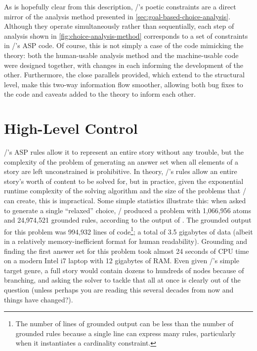 As is hopefully clear from this description, \dunyazad/'s poetic constraints are a direct mirror of the analysis method presented in \cref{sec:goal-based-choice-analysis}.
%
Although they operate simultaneously rather than sequentially, each step of analysis shown in \cref{fig:choice-analysis-method} corresponds to a set of constraints in \dunyazad/'s ASP code.
%
Of course, this is not simply a case of the code mimicking the theory: both the human-usable analysis method and the machine-usable code were designed together, with changes in each informing the development of the other.
%
Furthermore, the close parallels provided, which extend to the structural level, make this two-way information flow smoother, allowing both bug fixes to the code and caveats added to the theory to inform each other.



\section{High-Level Control}
\label{sec:dunyazad-control}%

\dunyazad/'s ASP rules allow it to represent an entire story without any trouble, but the complexity of the problem of generating an answer set when all elements of a story are left unconstrained is prohibitive.
%
In theory, \dunyazad/'s rules allow an entire story's worth of content to be solved for, but in practice, given the exponential runtime complexity of the solving algorithm and the size of the problems that \dunyazad/ can create, this is impractical.
%
Some simple statistics illustrate this: when asked to generate a single ``relaxed'' choice, \dunyazad/ produced a problem with 1,066,956 atoms and 24,974,521 grounded rules, according to the output of .
%
The grounded output for this problem was 994,932 lines of code\footnote{The number of lines of grounded output can be less than the number of grounded rules because a single line can express many rules, particularly when it instantiates a cardinality constraint.}; a total of 3.5 gigabytes of data (albeit in a relatively memory-inefficient format for human readability).
%
Grounding and finding the first answer set for this problem took almost 24 seconds of CPU time on a modern Intel i7 laptop with 12 gigabytes of RAM.
%
Even given \dunyazad/'s simple target genre, a full story would contain dozens to hundreds of nodes because of branching, and asking the solver to tackle that all at once is clearly out of the question (unless perhaps you are reading this several decades from now and things have changed?).


